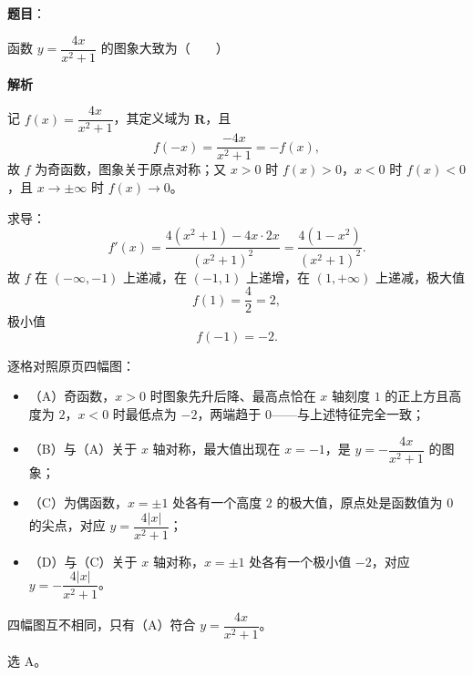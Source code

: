 \begin{answer}

\textbf{题目}：

函数 $y=\dfrac{4x}{x^2+1}$ 的图象大致为\mbox{（　　）}
\nopagebreak[4]
\begin{center}\end{center}
\nopagebreak[4]
\textbf{解析}

记 $f(x)=\dfrac{4x}{x^2+1}$，其定义域为 $\mathbf R$，且
\nopagebreak[4]
\[f(-x)=\frac{-4x}{x^2+1}=-f(x),\]
故 $f$ 为奇函数，图象关于原点对称；又 $x>0$ 时 $f(x)>0$，$x<0$ 时 $f(x)<0$，且 $x\to\pm\infty$ 时 $f(x)\to0$。

求导：
\nopagebreak[4]
\[f'(x)=\frac{4(x^2+1)-4x\cdot2x}{(x^2+1)^2}=\frac{4(1-x^2)}{(x^2+1)^2}.\]
故 $f$ 在 $(-\infty,-1)$ 上递减，在 $(-1,1)$ 上递增，在 $(1,+\infty)$ 上递减，极大值
\nopagebreak[4]
\[f(1)=\frac42=2,\]
极小值
\nopagebreak[4]
\[f(-1)=-2 .\]

逐格对照原页四幅图：

\begin{itemize}
\item （A）奇函数，$x>0$ 时图象先升后降、最高点恰在 $x$ 轴刻度 $1$ 的正上方且高度为 $2$，$x<0$ 时最低点为 $-2$，两端趋于 $0$——与上述特征完全一致；
\item （B）与（A）关于 $x$ 轴对称，最大值出现在 $x=-1$，是 $y=-\dfrac{4x}{x^2+1}$ 的图象；
\item （C）为偶函数，$x=\pm1$ 处各有一个高度 $2$ 的极大值，原点处是函数值为 $0$ 的尖点，对应 $y=\dfrac{4|x|}{x^2+1}$；
\item （D）与（C）关于 $x$ 轴对称，$x=\pm1$ 处各有一个极小值 $-2$，对应 $y=-\dfrac{4|x|}{x^2+1}$。
\end{itemize}

四幅图互不相同，只有（A）符合 $y=\dfrac{4x}{x^2+1}$。

选 A。


\end{answer}
